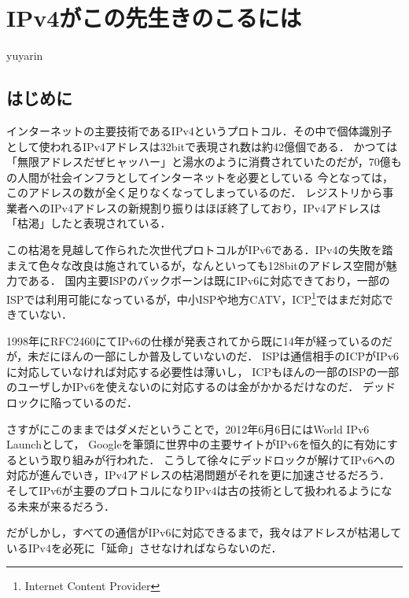

\chapter{IPv4がこの先生きのこるには}

\begin{flushright}
 yuyarin %
\end{flushright}

\section{はじめに}

\lettrine{イ}
ンターネットの主要技術であるIPv4というプロトコル．その中で個体識別子として使われるIPv4アドレスは32bitで表現され数は約42億個である．
かつては「無限アドレスだぜヒャッハー」と湯水のように消費されていたのだが，70億もの人間が社会インフラとしてインターネットを必要としている
今となっては，このアドレスの数が全く足りなくなってしまっているのだ．
レジストリから事業者へのIPv4アドレスの新規割り振りはほぼ終了しており，IPv4アドレスは「枯渇」したと表現されている．

この枯渇を見越して作られた次世代プロトコルがIPv6である．IPv4の失敗を踏まえて色々な改良は施されているが，なんといっても128bitのアドレス空間が魅力である．
国内主要ISPのバックボーンは既にIPv6に対応できており，一部のISPでは利用可能になっているが，中小ISPや地方CATV，ICP\footnote{Internet Content Provider}ではまだ対応できていない．

1998年にRFC2460にてIPv6の仕様が発表されてから既に14年が経っているのだが，未だにほんの一部にしか普及していないのだ．
ISPは通信相手のICPがIPv6に対応していなければ対応する必要性は薄いし，
ICPもほんの一部のISPの一部のユーザしかIPv6を使えないのに対応するのは金がかかるだけなのだ．
デッドロックに陥っているのだ．

さすがにこのままではダメだということで，2012年6月6日にはWorld IPv6 Launchとして，
Googleを筆頭に世界中の主要サイトがIPv6を恒久的に有効にするという取り組みが行われた．
こうして徐々にデッドロックが解けてIPv6への対応が進んでいき，IPv4アドレスの枯渇問題がそれを更に加速させるだろう．
そしてIPv6が主要のプロトコルになりIPv4は古の技術として扱われるようになる未来が来るだろう．

だがしかし，すべての通信がIPv6に対応できるまで，我々はアドレスが枯渇しているIPv4を必死に「延命」させなければならないのだ．

